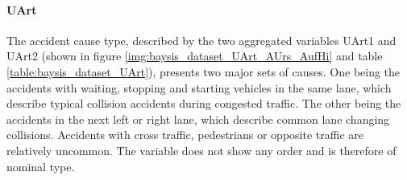 \paragraph{UArt}
The accident cause type, described by the two aggregated variables UArt1 and UArt2 (shown in figure \autoref{img:baysis_dataset_UArt_AUrs_AufHi} and table \autoref{table:baysis_dataset_UArt}), presents two major sets of causes. One being the accidents with waiting, stopping and starting vehicles in the same lane, which describe typical collision accidents during congested traffic. The other being the accidents in the next left or right lane, which describe common lane changing collisions. Accidents with cross traffic, pedestrians or opposite traffic are relatively uncommon. The variable does not show any order and is therefore of nominal type.

